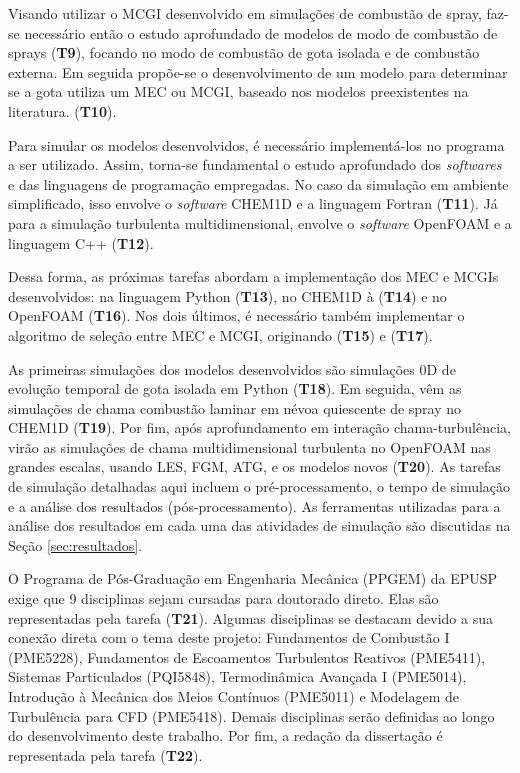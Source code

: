 Visando utilizar o MCGI desenvolvido em simulações de combustão de spray, faz-se necessário então o estudo aprofundado de modelos de modo de combustão de sprays (\textbf{T9}), focando no modo de combustão de gota isolada e de combustão externa. Em seguida propõe-se o desenvolvimento de um modelo para determinar se a gota utiliza um MEC ou MCGI, baseado nos modelos preexistentes na literatura. (\textbf{T10}).

Para simular os modelos desenvolvidos, é necessário implementá-los no programa a ser utilizado.
Assim, torna-se fundamental o estudo aprofundado dos \emph{softwares} e das linguagens de programação empregadas. 
No caso da simulação em ambiente simplificado, isso envolve o \emph{software} CHEM1D e a linguagem Fortran (\textbf{T11}).
Já para a simulação turbulenta multidimensional, envolve o \emph{software} OpenFOAM e a linguagem C++ (\textbf{T12}).

Dessa forma, as próximas tarefas abordam a implementação dos MEC e MCGIs desenvolvidos: na linguagem Python  (\textbf{T13}), no  CHEM1D à  (\textbf{T14}) e no OpenFOAM  (\textbf{T16}).
Nos dois últimos, é necessário também implementar o algoritmo de seleção entre MEC e MCGI, originando (\textbf{T15}) e (\textbf{T17}).  

As primeiras simulações dos modelos desenvolvidos são simulações 0D de evolução temporal de gota isolada em Python (\textbf{T18}). 
Em seguida, vêm as simulações de chama combustão laminar em névoa quiescente de spray no CHEM1D (\textbf{T19}).
Por fim, após aprofundamento em interação chama-turbulência, virão as simulações de chama multidimensional turbulenta no OpenFOAM nas grandes escalas, usando LES, FGM, ATG, e os modelos novos (\textbf{T20}).
As tarefas de simulação detalhadas aqui incluem o pré-processamento, o tempo de simulação e a análise dos resultados (pós-processamento).
As ferramentas utilizadas para a análise dos resultados em cada uma das atividades de simulação são discutidas na Seção \ref{sec:resultados}.

O Programa de Pós-Graduação em Engenharia Mecânica (PPGEM) da EPUSP exige que 9 disciplinas sejam cursadas para doutorado direto.
Elas são representadas pela tarefa (\textbf{T21}).
Algumas disciplinas se destacam devido a sua conexão direta com o tema deste projeto: Fundamentos de Combustão I (PME5228), Fundamentos de Escoamentos Turbulentos Reativos (PME5411), Sistemas Particulados (PQI5848), Termodinâmica Avançada I (PME5014), Introdução à Mecânica dos Meios Contínuos (PME5011) e Modelagem de Turbulência para CFD (PME5418).
Demais disciplinas serão definidas ao longo do desenvolvimento deste trabalho.
Por fim, a redação da dissertação é representada pela tarefa (\textbf{T22}).



